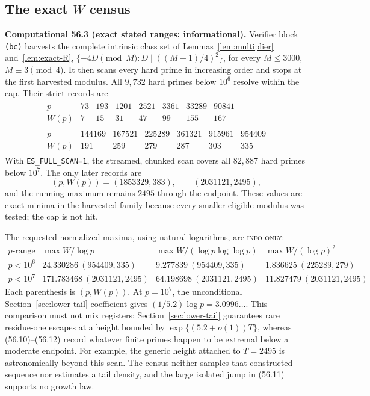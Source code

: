 \documentclass[10pt,reqno]{amsart}
\theoremstyle{definition}
\newcommand{\1}{\mathbf 1}
\begin{document}
\subsection{The exact $W$ census}
\medskip\noindent\textbf{Computational 56.3 (exact stated ranges;
informational).}
Verifier block \texttt{(bc)} harvests the complete intrinsic class set of
Lemmas~\ref{lem:multiplier} and~\ref{lem:exact-R},
$\{-4D\pmod M:D\mid((M+1)/4)^2\}$, for every $M\leq3000$,
$M\equiv3\pmod4$.  It then scans every hard prime in increasing order and
stops at the first harvested modulus.  All $9{,}732$ hard primes below
$10^6$ resolve within the cap.  Their strict records are
\begin{equation}\tag{56.10}
\begin{gathered}
\begin{array}{c|rrrrrrr}
p&73&193&1201&2521&3361&33289&90841\\
W(p)&7&15&31&47&99&155&167
\end{array}\\[3pt]
\begin{array}{c|rrrrrr}
p&144169&167521&225289&361321&915961&954409\\
W(p)&191&259&279&287&303&335
\end{array}
\end{gathered}
\end{equation}
With \texttt{ES\_FULL\_SCAN=1}, the streamed, chunked scan covers all
$82{,}887$ hard primes below $10^7$.  The only later records are
\begin{equation}\tag{56.11}
 (p,W(p))=(1853329,383),\qquad(2031121,2495),
\end{equation}
and the running maximum remains $2495$ through the endpoint.  These values
are exact minima in the harvested family because every smaller eligible
modulus was tested; the cap is not hit.

The requested normalized maxima, using natural logarithms, are
\textsc{info-only}:
\begingroup
\scriptsize
\setlength{\arraycolsep}{3pt}
\begin{equation}\tag{56.12}
\begin{array}{c|c|c|c}
 p\text{-range}&\max W/\log p&\max W/(\log p\log\log p)&
                    \max W/(\log p)^2\\ \hline
p<10^6&24.330286\ (954409,335)&9.277839\ (954409,335)&
       1.836625\ (225289,279)\\
p<10^7&171.783468\ (2031121,2495)&64.198698\ (2031121,2495)&
       11.827479\ (2031121,2495)
\end{array}
\end{equation}
\endgroup
Each parenthesis is $(p,W(p))$.  At $p=10^7$, the unconditional
Section~\ref{sec:lower-tail} coefficient gives
$(1/5.2)\log p=3.0996\ldots$.  This comparison must not mix registers:
Section~\ref{sec:lower-tail} guarantees rare residue-one escapes at a height
bounded by $\exp\{(5.2+o(1))T\}$, whereas (56.10)--(56.12) record whatever
finite primes happen to be extremal below a moderate endpoint.  For example,
the generic height attached to $T=2495$ is astronomically beyond this scan.
The census neither samples that constructed sequence nor estimates a tail
density, and the large isolated jump in (56.11) supports no growth law.
\end{document}
